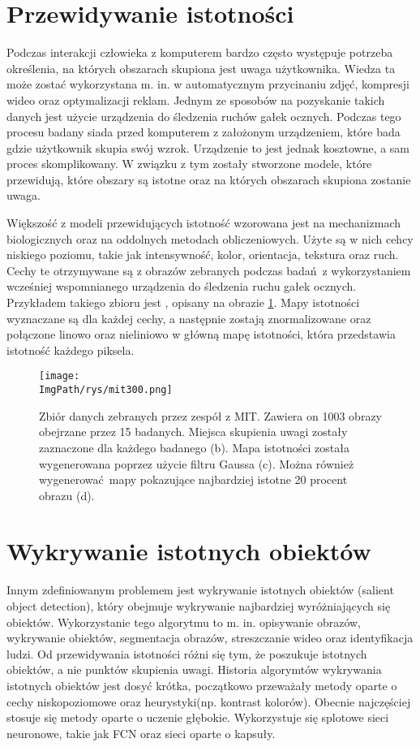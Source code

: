 \documentclass[a4paper,12pt,twoside,openany]{report}
\newcommand{\ImgPath}{.}
\begin{document}
	\section{Przewidywanie istotności}
	Podczas interakcji człowieka z komputerem bardzo często występuje potrzeba określenia, na których obszarach skupiona jest uwaga użytkownika. Wiedza ta może zostać wykorzystana m. in. w automatycznym przycinaniu zdjęć, kompresji wideo oraz optymalizacji reklam. Jednym ze sposobów na pozyskanie takich danych jest użycie urządzenia do śledzenia ruchów gałek ocznych. Podczas tego procesu badany siada przed komputerem z założonym urządzeniem, które bada gdzie użytkownik skupia swój wzrok. Urządzenie to jest jednak kosztowne, a sam proces skomplikowany. W związku z tym zostały stworzone modele, które przewidują, które obszary są istotne oraz na których obszarach skupiona zostanie uwaga.

	Większość z modeli przewidujących istotność wzorowana jest na mechanizmach biologicznych oraz na oddolnych metodach obliczeniowych. Użyte są w nich cehcy niskiego poziomu, takie jak intensywność, kolor, orientacja, tekstura oraz ruch. Cechy te otrzymywane są z obrazów zebranych podczas badań z wykorzystaniem wcześniej wspomnianego urządzenia do śledzenia ruchu gałek ocznych. Przykładem takiego zbioru jest \cite{Judd_2009}, opisany na obrazie \ref{mit}. Mapy istotności wyznaczane są dla każdej cechy, a następnie zostają znormalizowane oraz połączone linowo oraz nieliniowo w główną mapę istotności, która przedstawia istotność każdego piksela.

	\begin{figure}[h]
		\centering
		\texttt{[image: \\ImgPath/rys/mit300.png]}
		\caption{Zbiór danych zebranych przez zespół z MIT. Zawiera on 1003 obrazy obejrzane przez 15 badanych. Miejsca skupienia uwagi zostały zaznaczone dla każdego badanego (b). Mapa istotności została wygenerowana poprzez użycie filtru Gaussa (c). Można również wygenerować mapy pokazujące najbardziej istotne 20 procent obrazu (d).}
		\label{mit}
	\end{figure}

	\section{Wykrywanie istotnych obiektów}
	Innym zdefiniowanym problemem jest wykrywanie istotnych obiektów (salient object detection), który obejmuje wykrywanie najbardziej wyróżniających się obiektów. Wykorzystanie tego algorytmu to m. in. opisywanie obrazów, wykrywanie obiektów, segmentacja obrazów, streszczanie wideo oraz identyfikacja ludzi. Od przewidywania istotności różni się tym, że poszukuje istotnych obiektów, a nie punktów skupienia uwagi. Historia algorymtów wykrywania istotnych obiektów jest dosyć krótka, początkowo przeważały metody oparte o cechy niskopoziomowe oraz heurystyki(np. kontrast kolorów). Obecnie najczęściej stosuje się metody oparte o uczenie głębokie. Wykorzystuje się splotowe sieci neuronowe, takie jak FCN oraz sieci oparte o kapsuły.
\end{document}
